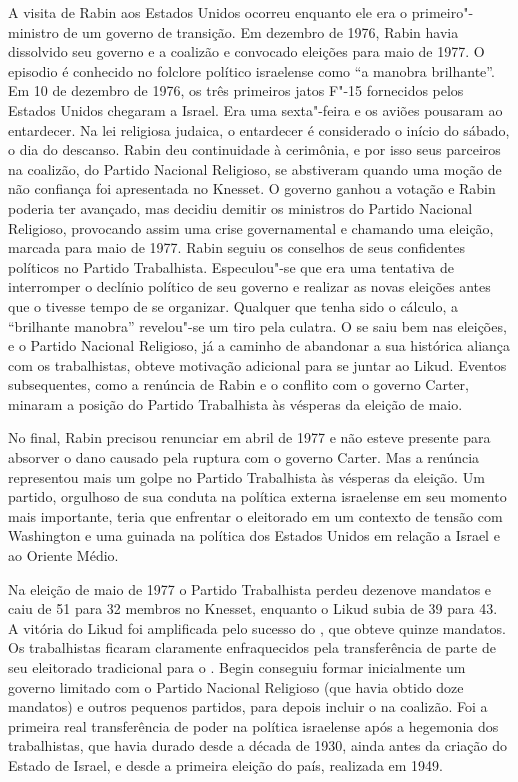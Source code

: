 A visita de Rabin aos Estados Unidos ocorreu enquanto ele era o primeiro"-ministro
de um governo de transição. Em dezembro de 1976, Rabin havia
dissolvido seu governo e a coalizão e convocado eleições para maio de
1977. O episodio é conhecido no folclore político israelense como ``a
manobra brilhante''. Em 10 de dezembro de 1976, os três primeiros jatos
F"-15 fornecidos pelos Estados Unidos chegaram a Israel. Era uma sexta"-feira e os
aviões pousaram ao entardecer. Na lei religiosa judaica, o entardecer é
considerado o início do sábado, o dia do descanso. Rabin deu
continuidade à cerimônia, e por isso seus parceiros na coalizão, do
Partido Nacional Religioso, se abstiveram quando uma moção de
não confiança foi apresentada no Knesset. O governo ganhou a votação e
Rabin poderia ter avançado, mas decidiu demitir os ministros do Partido
Nacional Religioso, provocando assim uma crise governamental e chamando
uma eleição, marcada para maio de 1977. Rabin seguiu os conselhos de
seus confidentes políticos no Partido Trabalhista. Especulou"-se que era
uma tentativa de interromper o declínio político de seu governo e
realizar as novas eleições antes que o  tivesse tempo de se
organizar. Qualquer que tenha sido o cálculo, a ``brilhante manobra''
revelou"-se um tiro pela culatra. O  se saiu bem nas eleições,
e o Partido Nacional Religioso,
já a caminho de abandonar a sua histórica aliança com os trabalhistas,
obteve motivação adicional para se juntar ao Likud. Eventos
subsequentes, como a renúncia de Rabin e o conflito com o governo
Carter, minaram a posição do Partido Trabalhista às vésperas da eleição
de maio.

No final, Rabin precisou renunciar em abril de 1977 e não esteve
presente para absorver o dano causado pela ruptura com o governo Carter.
Mas a renúncia representou mais um golpe no Partido Trabalhista às
vésperas da eleição. Um partido, orgulhoso de sua conduta na política
externa israelense em seu momento mais importante, teria que enfrentar o
eleitorado em um contexto de tensão com Washington e uma guinada na
política dos Estados Unidos em relação a Israel e ao Oriente Médio.

Na eleição de maio de 1977 o Partido Trabalhista perdeu dezenove
mandatos e caiu de 51 para 32 membros no Knesset,
enquanto o Likud subia de 39 para 43. A vitória
do Likud foi amplificada pelo sucesso do , que obteve quinze
mandatos. Os trabalhistas ficaram claramente enfraquecidos pela
transferência de parte de seu eleitorado tradicional para o . Begin
conseguiu formar inicialmente um governo limitado com o Partido Nacional Religioso (que havia
obtido doze mandatos) e outros pequenos partidos, para depois incluir o
 na coalizão. Foi a primeira real transferência de poder na política
israelense após a hegemonia dos trabalhistas, que havia durado desde a
década de 1930, ainda antes da criação do Estado de Israel, e desde a
primeira eleição do país, realizada em 1949.

